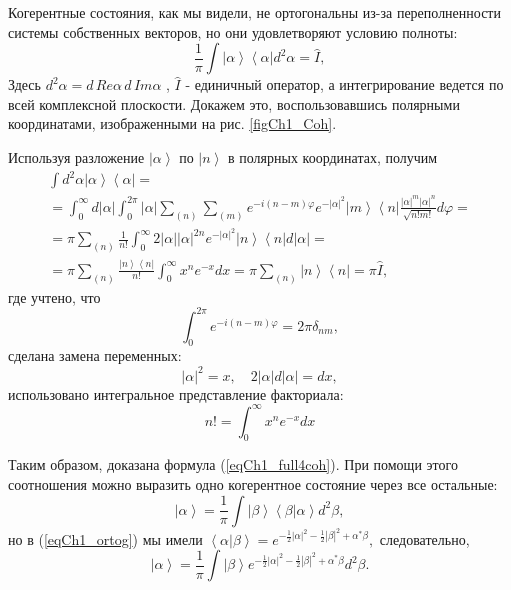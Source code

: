 Когерентные состояния, как мы видели, не ортогональны из-за
переполненности системы собственных векторов, но они удовлетворяют
условию полноты: 
\begin{equation}
\frac{1}{\pi}\int \left|\alpha\right>\left<\alpha\right| d^2 \alpha =
\hat{I},
\label{eqCh1_full4coh}
\end{equation}
Здесь $d^2 \alpha = d\, Re \alpha\, d\, Im \alpha$ , $\hat{I}$ - единичный
оператор, а интегрирование ведется по всей комплексной
плоскости. Докажем это, воспользовавшись полярными координатами,
изображенными на рис. \ref{figCh1_Coh}.  



Используя разложение $\left|\alpha\right>$ по $\left|n\right>$ в
полярных координатах, получим 
\begin{eqnarray}
\int d^2 \alpha \left|\alpha\right>\left<\alpha\right| =
\nonumber \\
=
\int_0^{\infty} d \left|\alpha\right|\int_0^{2
  \pi}\left|\alpha\right|\sum_{(n)}\sum_{(m)}e^{-i \left(n -
  m\right)\varphi}
e^{-\left|\alpha\right|^2}\left|m\right>\left<n\right|
\frac{\left|\alpha\right|^m \left|\alpha\right|^n}{\sqrt{n! m!}} d\varphi
= 
\nonumber \\
= \pi \sum_{(n)}\frac{1}{n!}\int_0^{\infty} 2
\left|\alpha\right|\left|\alpha\right|^{2n} e^{-\left|\alpha\right|^2} 
\left|n\right>\left<n\right|
d\left|\alpha\right| = 
\nonumber \\
=
\pi
\sum_{(n)}\frac{\left|n\right>\left<n\right|}{n!} \int_0^{\infty}x^n
e^{-x}dx = 
\pi \sum_{(n)}\left|n\right>\left<n\right| = \pi \hat{I},
\end{eqnarray}
где учтено, что
\[
\int_0^{2\pi} e^{-i \left(n - m\right)\varphi} = 2 \pi \delta_{nm},
\]
сделана замена переменных:  
\[
\left|\alpha\right|^2 = x, \quad 2 \left|\alpha\right| d
\left|\alpha\right| = d x,
\]
использовано интегральное представление факториала:
\[
n! = \int_0^{\infty}x^ne^{-x}dx
\]

Таким образом, доказана формула (\ref{eqCh1_full4coh}). При помощи
этого соотношения можно выразить одно когерентное состояние через все
остальные: 
\[
\left|\alpha\right> = \frac{1}{\pi}\int\left|\beta\right>\left<\beta\right|\left.\alpha\right> d^2 \beta,
\]
но в (\ref{eqCh1_ortog}) мы имели
\(
\left<\alpha\right|\left.\beta\right> = 
e^{
-\frac{1}{2} \left|\alpha\right|^2  -\frac{1}{2} \left|\beta\right|^2
+
\alpha^{*} \beta
},
\)
следовательно,
\begin{equation}
\left|\alpha\right> = \frac{1}{\pi}\int\left|\beta\right>
e^{
-\frac{1}{2} \left|\alpha\right|^2  -\frac{1}{2} \left|\beta\right|^2
+
\alpha^{*} \beta
} d^2 \beta.
\end{equation}
